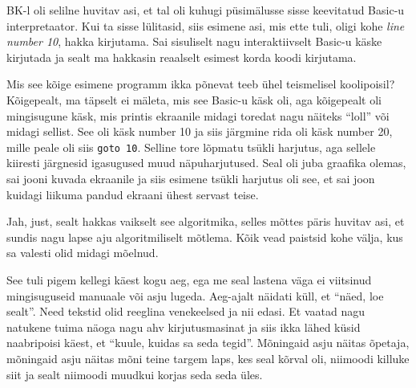 BK-l oli selilne huvitav asi, et tal oli kuhugi püsimälusse sisse keevitatud Basic-u interpretaator. Kui ta sisse lülitasid, siis esimene asi, mis ette tuli, oligi kohe \emph{line number 10}, hakka kirjutama. Sai sisuliselt nagu interaktiivselt Basic-u käske kirjutada ja sealt ma hakkasin reaalselt esimest korda koodi kirjutama. 


Mis see kõige esimene programm ikka põnevat teeb ühel teismelisel koolipoisil? Kõigepealt, ma täpselt ei mäleta, mis see Basic-u käsk oli, aga kõigepealt oli mingisugune käsk, mis printis ekraanile midagi toredat nagu näiteks \enquote{loll} või midagi sellist. See oli käsk number 10 ja siis järgmine rida oli käsk number 20, mille peale oli siis \verb|goto 10|. Selline tore lõpmatu tsükli harjutus, aga sellele kiiresti järgnesid igasugused muud näpuharjutused. Seal oli juba graafika olemas, sai jooni kuvada ekraanile ja siis esimene tsükli harjutus oli see, et sai joon kuidagi liikuma pandud ekraani ühest servast teise. 


Jah, just, sealt hakkas vaikselt see algoritmika, selles mõttes päris huvitav asi, et sundis nagu lapse aju algoritmiliselt mõtlema. Kõik vead paistsid kohe välja, kus sa valesti olid midagi mõelnud. 


See tuli pigem kellegi käest kogu aeg, ega me seal lastena väga ei viitsinud mingisuguseid manuaale või asju lugeda. Aeg-ajalt näidati küll, et \enquote{näed, loe sealt}. Need tekstid olid reeglina  venekeelsed ja nii edasi. Et vaatad nagu natukene tuima näoga nagu ahv kirjutusmasinat ja siis ikka lähed küsid naabripoisi käest, et \enquote{kuule, kuidas sa seda tegid}. Mõningaid asju näitas õpetaja, mõningaid asju näitas mõni teine targem laps, kes seal kõrval oli, niimoodi killuke siit ja sealt niimoodi muudkui korjas seda seda üles. 


